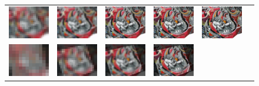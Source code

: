\begin{landscape}
\begin{figure}
\begin{center}
\begin{tabular}{c c c c c c}
        \includegraphics[width=2.2cm]{main/chapter03/data/homography/img_dst_2.jpg} &
        \includegraphics[width=2.2cm]{main/chapter03/data/homography/img_dst_3.jpg} &
        \includegraphics[width=2.2cm]{main/chapter03/data/homography/img_dst_4.jpg} &
        \includegraphics[width=2.2cm]{main/chapter03/data/homography/img_dst_5.jpg} &
        \includegraphics[width=2.2cm]{main/chapter03/data/homography/img_dst_7.jpg} \\
        \includegraphics[width=2.2cm]{main/chapter03/data/homography/img_src_to_dst_1.jpg} &
        \includegraphics[width=2.2cm]{main/chapter03/data/homography/img_src_to_dst_2.jpg} &
        \includegraphics[width=2.2cm]{main/chapter03/data/homography/img_src_to_dst_3.jpg} &
        \includegraphics[width=2.2cm]{main/chapter03/data/homography/img_src_to_dst_4.jpg} &

\end{tabular}
\end{center}
\end{figure}
\end{landscape}
